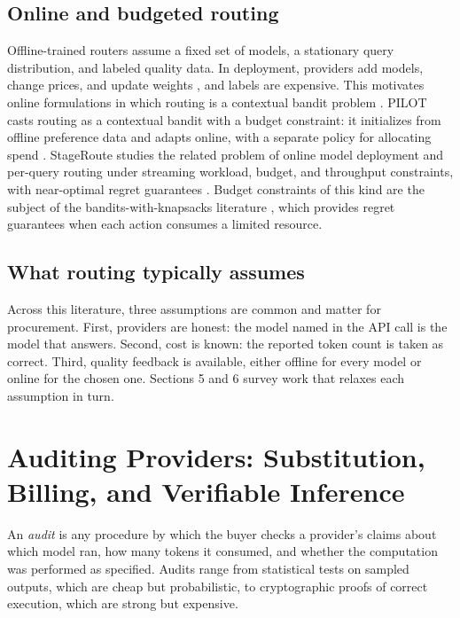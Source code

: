 \subsection{Online and budgeted routing}\label{online-and-budgeted-routing}

Offline-trained routers assume a fixed set of models, a stationary query distribution, and labeled quality data. In deployment, providers add models, change prices, and update weights \cite{chen2024drift}, and labels are expensive. This motivates online formulations in which routing is a contextual bandit problem \cite{lattimore2020bandit, auer2002ucb}. PILOT casts routing as a contextual bandit with a budget constraint: it initializes from offline preference data and adapts online, with a separate policy for allocating spend \cite{panda2025pilot}. StageRoute studies the related problem of online model deployment and per-query routing under streaming workload, budget, and throughput constraints, with near-optimal regret guarantees \cite{li2026stageroute}. Budget constraints of this kind are the subject of the bandits-with-knapsacks literature \cite{badanidiyuru2018bwk}, which provides regret guarantees when each action consumes a limited resource.

\subsection{What routing typically assumes}\label{what-routing-typically-assumes}

Across this literature, three assumptions are common and matter for procurement. First, providers are honest: the model named in the API call is the model that answers. Second, cost is known: the reported token count is taken as correct. Third, quality feedback is available, either offline for every model or online for the chosen one. Sections 5 and 6 survey work that relaxes each assumption in turn.

\section{Auditing Providers: Substitution, Billing, and Verifiable Inference}\label{auditing-providers-substitution-billing-and-verifiable-inference}

An \emph{audit} is any procedure by which the buyer checks a provider's claims about which model ran, how many tokens it consumed, and whether the computation was performed as specified. Audits range from statistical tests on sampled outputs, which are cheap but probabilistic, to cryptographic proofs of correct execution, which are strong but expensive.

